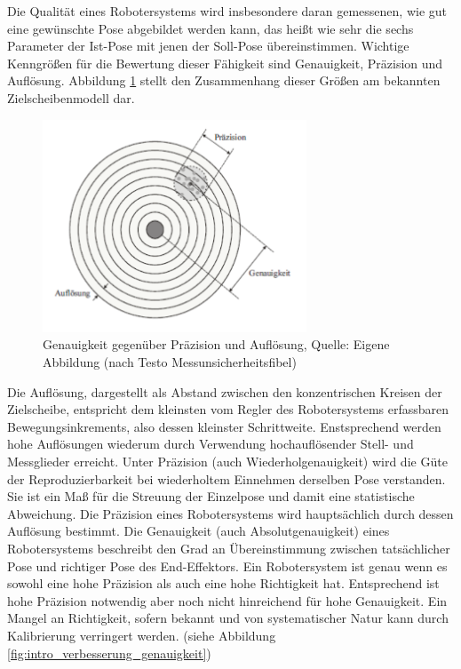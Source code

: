 Die Qualität eines Robotersystems wird insbesondere daran gemessenen, wie gut eine gewünschte Pose abgebildet werden kann, das heißt wie sehr die sechs Parameter der Ist-Pose mit jenen der Soll-Pose übereinstimmen. Wichtige Kenngrößen für die Bewertung dieser Fähigkeit sind Genauigkeit, Präzision und Auflösung. Abbildung \ref{fig:intro_genauigkeit} stellt den Zusammenhang dieser Größen am bekannten Zielscheibenmodell dar.

\begin{figure}[H]
    \centering
    \includegraphics[width=0.7\textwidth]{graphics/intro/intro_genauigkeit}
    \caption[Folie]{Genauigkeit gegenüber Präzision und Auflösung, Quelle: Eigene Abbildung (nach Testo Messunsicherheitsfibel)}
    \label{fig:intro_genauigkeit}
\end{figure}

Die Auflösung, dargestellt als Abstand zwischen den konzentrischen Kreisen der Zielscheibe, entspricht dem kleinsten vom Regler des Robotersystems erfassbaren Bewegungsinkrements, also dessen kleinster Schrittweite. Enstsprechend werden hohe Auflösungen wiederum durch Verwendung  hochauflösender Stell- und Messglieder erreicht. Unter Präzision (auch Wiederholgenauigkeit) wird die Güte der Reproduzierbarkeit bei wiederholtem Einnehmen derselben Pose verstanden. Sie ist ein Maß für die Streuung der Einzelpose und damit eine statistische Abweichung. Die Präzision eines Robotersystems wird hauptsächlich durch dessen Auflösung bestimmt. Die Genauigkeit (auch Absolutgenauigkeit) eines Robotersystems beschreibt den Grad an Übereinstimmung zwischen tatsächlicher Pose und richtiger Pose des End-Effektors. Ein Robotersystem ist genau wenn es sowohl eine hohe Präzision als auch eine hohe Richtigkeit hat. Entsprechend ist hohe Präzision notwendig aber noch nicht hinreichend für hohe Genauigkeit. Ein Mangel an Richtigkeit, sofern bekannt und von systematischer Natur kann durch Kalibrierung verringert werden. (siehe Abbildung \ref{fig:intro_verbesserung_genauigkeit})

